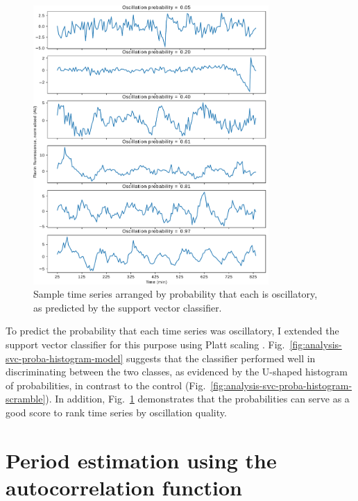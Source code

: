 \begin{figure}
  \centering
  \includegraphics[width=0.8\textwidth]{svm_3_edit.pdf}

  \caption{
    Sample time series arranged by probability that each is oscillatory, as predicted by the support vector classifier.
  }
  \label{fig:analysis-svc-proba-gallery}
\end{figure}

To predict the probability that each time series was oscillatory, I extended the support vector classifier for this purpose using Platt scaling \parencite{plattProbabilisticOutputsSupport1999}.
Fig.\ \ref{fig:analysis-svc-proba-histogram-model} suggests that the classifier performed well in discriminating between the two classes, as evidenced by the U-shaped histogram of probabilities, in contrast to the control (Fig.\ \ref{fig:analysis-svc-proba-histogram-scramble}).
In addition, Fig.\ \ref{fig:analysis-svc-proba-gallery} demonstrates that the probabilities can serve as a good score to rank time series by oscillation quality.


\section{Period estimation using the autocorrelation function}
\label{sec:analysis-characterisation}

